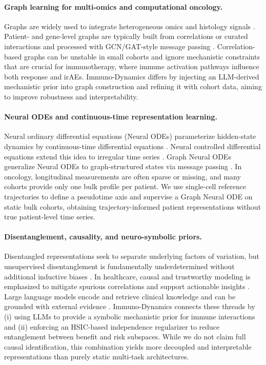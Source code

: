 \documentclass{article}
\begin{document}
\paragraph{Graph learning for multi-omics and computational oncology.}
Graphs are widely used to integrate heterogeneous omics and histology signals \cite{lu2021data,chen2022pan}. Patient- and gene-level graphs are typically built from correlations or curated interactions and processed with GCN/GAT-style message passing \cite{kipf2017semi,velickovic2018graph}. Correlation-based graphs can be unstable in small cohorts and ignore mechanistic constraints that are crucial for immunotherapy, where immune activation pathways influence both response and irAEs. Immuno-Dynamics differs by injecting an LLM-derived mechanistic prior into graph construction and refining it with cohort data, aiming to improve robustness and interpretability.

\paragraph{Neural ODEs and continuous-time representation learning.}
Neural ordinary differential equations (Neural ODEs) parameterize hidden-state dynamics by continuous-time differential equations \cite{chen2018neural,rubanova2019latent}. Neural controlled differential equations extend this idea to irregular time series \cite{kidger2020neural}. Graph Neural ODEs generalize Neural ODEs to graph-structured states via message passing \cite{poli2019graph}. In oncology, longitudinal measurements are often sparse or missing, and many cohorts provide only one bulk profile per patient. We use single-cell reference trajectories to define a pseudotime axis and supervise a Graph Neural ODE on static bulk cohorts, obtaining trajectory-informed patient representations without true patient-level time series.

\paragraph{Disentanglement, causality, and neuro-symbolic priors.}
Disentangled representations seek to separate underlying factors of variation, but unsupervised disentanglement is fundamentally underdetermined without additional inductive biases \cite{locatello2019challenging,scholkopf2021toward}. In healthcare, causal and trustworthy modeling is emphasized to mitigate spurious correlations and support actionable insights \cite{pearl2009causality,zhang2024trustworthy,holzinger2022explainable}. Large language models encode and retrieve clinical knowledge and can be grounded with external evidence \cite{singhal2023large,thirunavukarasu2023large,lewis2020retrieval,he2024exploring}. Immuno-Dynamics connects these threads by (i) using LLMs to provide a symbolic mechanistic prior for immune interactions and (ii) enforcing an HSIC-based independence regularizer to reduce entanglement between benefit and risk subspaces. While we do not claim full causal identification, this combination yields more decoupled and interpretable representations than purely static multi-task architectures.
\end{document}
